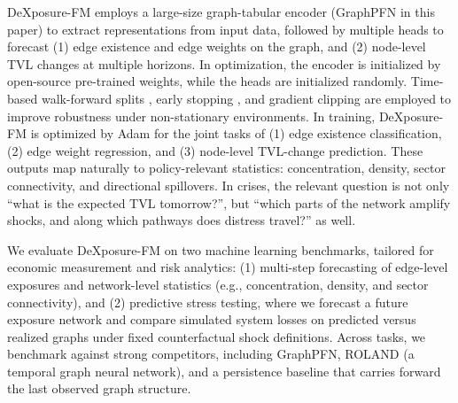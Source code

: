 DeXposure-FM employs a large-size graph-tabular encoder (GraphPFN \citep{eremeev2025turningtabularfoundationmodels} in this paper) to extract representations from input data, followed by multiple heads 
to forecast (1) edge existence and edge weights on the graph, and (2) node-level TVL changes at multiple horizons. In optimization, the encoder is initialized by open-source pre-trained weights, while the heads are initialized randomly. Time-based walk-forward splits \citep{BergmeirBenitez2012CVTS}, early stopping \citep{Prechelt1998EarlyStopping}, and gradient clipping \citep{PascanuEtAl2013RNNTraining} are employed to improve robustness under non-stationary environments. 
In training, %
DeXposure-FM is optimized by Adam \citep{KingmaBa2015Adam} for the joint tasks of (1) edge existence classification, (2) edge weight regression, and (3) node-level TVL-change prediction. These outputs map naturally to policy-relevant statistics: concentration, density, sector connectivity, and directional spillovers. In crises, the relevant question is not only ``what is the expected TVL tomorrow?'', but ``which parts of the network amplify shocks, and along which pathways does distress travel?'' as well.


We evaluate DeXposure-FM on two machine learning benchmarks, tailored for economic measurement and risk analytics: (1) multi-step forecasting of edge-level exposures and network-level statistics (e.g., concentration, density, and sector connectivity), and (2) predictive stress testing, where we forecast a future exposure network and compare simulated system losses on predicted versus realized graphs under fixed counterfactual shock definitions. Across tasks, we benchmark against strong competitors, including GraphPFN, ROLAND \citep{YouEtAl2022ROLAND} (a temporal graph neural network), and a persistence baseline that carries forward the last observed graph structure.

